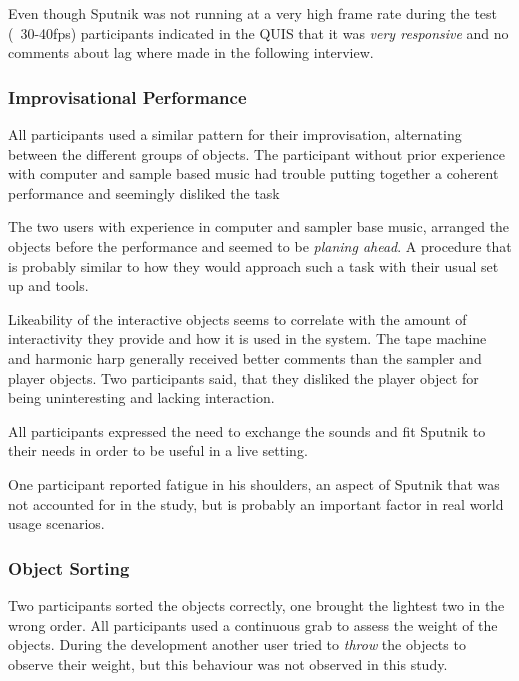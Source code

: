 \documentclass[10pt,a4paper]{scrartcl}
\begin{document}
Even though Sputnik was not running at a very high frame rate during the test (~30-40fps) participants indicated in the QUIS that it was \emph{very responsive} and no comments about lag where made in the following interview.




\subsubsection{Improvisational Performance}
All participants used a similar pattern for their improvisation, alternating between the different groups of objects. The participant without prior experience with computer and sample based music had trouble putting together a coherent performance and seemingly disliked the task

The two users with experience in computer and sampler base music, arranged the objects before the performance and seemed to be \emph{planing ahead}. A procedure that is probably similar to how they would approach such a task with their usual set up and tools.

Likeability of the interactive objects seems to correlate with the amount of interactivity they provide and how it is used in the system. The tape machine and harmonic harp generally received better comments than the sampler and player objects. Two participants said, that they disliked the player object for being uninteresting and lacking interaction.

All participants expressed the need to exchange the sounds and fit Sputnik to their needs in order to be useful in a live setting.

One participant reported fatigue in his shoulders, an aspect of Sputnik that was not accounted for in the study, but is probably an important factor in real world usage scenarios.


\subsubsection{Object Sorting}
Two participants sorted the objects correctly, one brought the lightest two in the wrong order. All participants used a continuous grab to assess the weight of the objects. During the development another user tried to \emph{throw} the objects to observe their weight, but this behaviour was not observed in this study.
\end{document}
